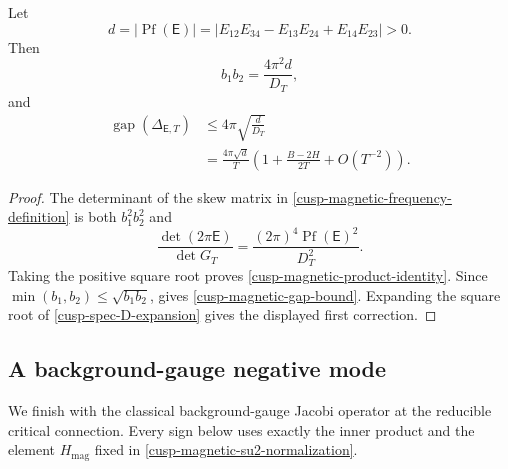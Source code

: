 \begin{corollary}
\label{cusp-magnetic-frequency-product}
Let
\[
 d=|\operatorname{Pf}(\mathsf E)|
 =\lvert E_{12}E_{34}-E_{13}E_{24}+E_{14}E_{23}\rvert>0.
\]
Then
\begin{equation}
 b_1b_2=\frac{4\pi^2d}{D_T},
 \label{cusp-magnetic-product-identity}
\end{equation}
and
\begin{align}
 \operatorname{gap}(\Delta_{\mathsf E,T})
 &\le 4\pi\sqrt{\frac d{D_T}}
 \label{cusp-magnetic-gap-bound}\\
 &=\frac{4\pi\sqrt d}{T}
 \left(1+\frac{B-2H}{2T}
 +O(T^{-2})\right).
 \nonumber
\end{align}
\end{corollary}

\begin{proof}
The determinant of the skew matrix in
\eqref{cusp-magnetic-frequency-definition} is both
\(b_1^2b_2^2\) and
\[
 \frac{\det(2\pi\mathsf E)}{\det G_T}
 =\frac{(2\pi)^4\operatorname{Pf}(\mathsf E)^2}{D_T^2}.
\]
Taking the positive square root proves
\eqref{cusp-magnetic-product-identity}.  Since
\(\min(b_1,b_2)\le\sqrt{b_1b_2}\),
 gives
\eqref{cusp-magnetic-gap-bound}.  Expanding the square root of
\cref{cusp-spec-D-expansion} gives the displayed first correction.
\end{proof}

\subsection{A background-gauge negative mode}

We finish with the classical background-gauge Jacobi operator at the
reducible critical connection.  Every sign below uses exactly the inner
product and the element \(H_{\mathrm{mag}}\) fixed in
\cref{cusp-magnetic-su2-normalization}.

